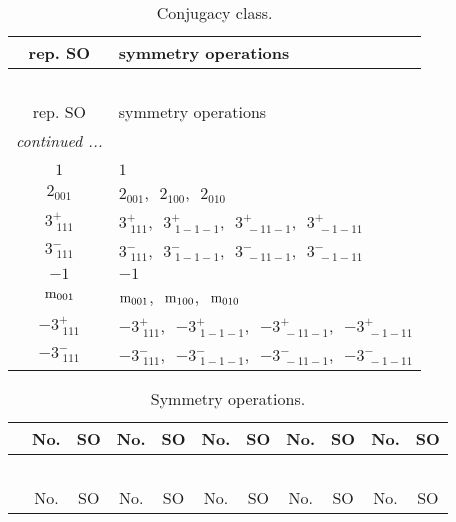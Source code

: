 \documentclass[fleqn,10pt,landscape]{article}
\begin{document}
\begin{itemize}
\begin{center}
\renewcommand{\arraystretch}{1.3}
\begin{longtable}{c|l}
\caption{Conjugacy class.}
 \\
 \hline \hline
rep. SO & symmetry operations \\ \hline \endfirsthead

\multicolumn{1}{l}{\tablename\ \thetable{}} \\
 \hline \hline
rep. SO & symmetry operations \\ \hline \endhead

 \hline \hline
\multicolumn{1}{r}{\footnotesize\it continued ...} \\ \endfoot

 \hline \hline
\multicolumn{1}{r}{} \\ \endlastfoot

$1$ & $1$ \\ \hline
$2{}_{001}$ & $2{}_{001}$,\,\, $2{}_{100}$,\,\, $2{}_{010}$ \\ \hline
$3^{+}_{\,\,111}$ & $3^{+}_{\,\,111}$,\,\, $3^{+}_{\,\,1-1-1}$,\,\, $3^{+}_{\,\,-11-1}$,\,\, $3^{+}_{\,\,-1-11}$ \\ \hline
$3^{-}_{\,\,111}$ & $3^{-}_{\,\,111}$,\,\, $3^{-}_{\,\,1-1-1}$,\,\, $3^{-}_{\,\,-11-1}$,\,\, $3^{-}_{\,\,-1-11}$ \\ \hline
$-1$ & $-1$ \\ \hline
${\rm m}_{001}$ & ${\rm m}_{001}$,\,\, ${\rm m}_{100}$,\,\, ${\rm m}_{010}$ \\ \hline
$-3^{+}_{\,\,111}$ & $-3^{+}_{\,\,111}$,\,\, $-3^{+}_{\,\,1-1-1}$,\,\, $-3^{+}_{\,\,-11-1}$,\,\, $-3^{+}_{\,\,-1-11}$ \\ \hline
$-3^{-}_{\,\,111}$ & $-3^{-}_{\,\,111}$,\,\, $-3^{-}_{\,\,1-1-1}$,\,\, $-3^{-}_{\,\,-11-1}$,\,\, $-3^{-}_{\,\,-1-11}$ \\
\end{longtable}
\end{center}
\begin{center}
\renewcommand{\arraystretch}{1.3}
\begin{longtable}{c|cc|cc|cc|cc|cc}
\caption{Symmetry operations.}
 \\
 \hline \hline
 & No. & SO & No. & SO & No. & SO & No. & SO & No. & SO \\ \hline \endfirsthead

\multicolumn{10}{l}{\tablename\ \thetable{}} \\
 \hline \hline
 & No. & SO & No. & SO & No. & SO & No. & SO & No. & SO \\ \hline \endhead


\end{longtable}
\end{center}
\end{itemize}
\end{document}
